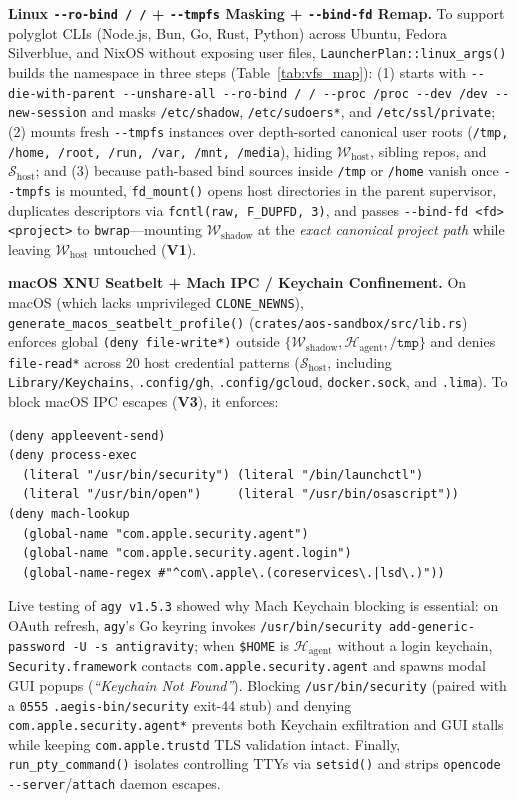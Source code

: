 \documentclass[10pt,journal,compsoc]{IEEEtran}
\begin{document}
\noindent\textbf{Linux \texttt{-\/-ro-bind / /} + \texttt{-\/-tmpfs} Masking + \texttt{-\/-bind-fd} Remap.}
To support polyglot CLIs (Node.js, Bun, Go, Rust, Python) across Ubuntu, Fedora Silverblue, and NixOS without exposing user files, \texttt{LauncherPlan::linux\_args()} builds the namespace in three steps (Table~\ref{tab:vfs_map}): (1) starts with \texttt{-\/-die-with-parent -\/-unshare-all -\/-ro-bind / / -\/-proc /proc -\/-dev /dev -\/-new-session} and masks \texttt{/etc/shadow}, \texttt{/etc/sudoers*}, and \texttt{/etc/ssl/private}; (2) mounts fresh \texttt{-\/-tmpfs} instances over depth-sorted canonical user roots (\texttt{/tmp, /home, /root, /run, /var, /mnt, /media}), hiding $\mathcal{W}_{\text{host}}$, sibling repos, and $\mathcal{S}_{\text{host}}$; and (3) because path-based bind sources inside \texttt{/tmp} or \texttt{/home} vanish once \texttt{-\/-tmpfs} is mounted, \texttt{fd\_mount()} opens host directories in the parent supervisor, duplicates descriptors via \texttt{fcntl(raw, F\_DUPFD, 3)}, and passes \texttt{-\/-bind-fd <fd> <project>} to \texttt{bwrap}---mounting $\mathcal{W}_{\text{shadow}}$ at the \emph{exact canonical project path} while leaving $\mathcal{W}_{\text{host}}$ untouched (\textbf{V1}).

\noindent\textbf{macOS XNU Seatbelt + Mach IPC / Keychain Confinement.}
On macOS (which lacks unprivileged \texttt{CLONE\_NEWNS}), \texttt{generate\_\allowbreak macos\_\allowbreak seatbelt\_\allowbreak profile()} (\texttt{crates/\allowbreak aos-sandbox/\allowbreak src/\allowbreak lib.rs}) enforces global \texttt{(deny file-write*)} outside $\{\mathcal{W}_{\text{shadow}}, \mathcal{H}_{\text{agent}}, \texttt{/tmp}\}$ and denies \texttt{file-read*} across 20 host credential patterns ($\mathcal{S}_{\text{host}}$, including \texttt{Library/Keychains}, \texttt{.config/gh}, \texttt{.config/gcloud}, \texttt{docker.sock}, and \texttt{.lima}). To block macOS IPC escapes (\textbf{V3}), it enforces:
\begin{lstlisting}
(deny appleevent-send)
(deny process-exec
  (literal "/usr/bin/security") (literal "/bin/launchctl")
  (literal "/usr/bin/open")     (literal "/usr/bin/osascript"))
(deny mach-lookup
  (global-name "com.apple.security.agent")
  (global-name "com.apple.security.agent.login")
  (global-name-regex #"^com\.apple\.(coreservices\.|lsd\.)"))
\end{lstlisting}
Live testing of \texttt{agy v1.5.3} showed why Mach Keychain blocking is essential: on OAuth refresh, \texttt{agy}'s Go keyring invokes \texttt{/usr/bin/security add-generic-password -U -s antigravity}; when \texttt{\$HOME} is $\mathcal{H}_{\text{agent}}$ without a login keychain, \texttt{Security.framework} contacts \texttt{com.apple.security.agent} and spawns modal GUI popups (\emph{``Keychain Not Found''}). Blocking \texttt{/usr/bin/security} (paired with a \texttt{0555} \texttt{.aegis-bin/security} exit-44 stub) and denying \texttt{com.apple.security.agent*} prevents both Keychain exfiltration and GUI stalls while keeping \texttt{com.apple.trustd} TLS validation intact. Finally, \texttt{run\_pty\_command()} isolates controlling TTYs via \texttt{setsid()} and strips \texttt{opencode -\/-server}/\texttt{attach} daemon escapes.
\end{document}
